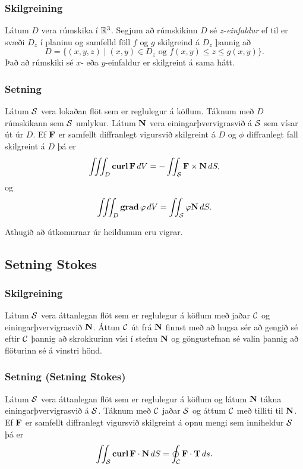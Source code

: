 \subsubsection{Skilgreining \rtask{}}
 Látum $D$ vera rúmskika í ${\mathbb R}^3$.  Segjum að rúmskikinn $D$ sé $z$-{\em einfaldur} ef til er svæði $D_z$ í planinu og samfelld föll $f$ og $g$ skilgreind á $D_z$ þannig að 
$$D=\{(x,y,z)\mid (x,y)\in D_z\mbox{ og }f(x,y)\leq z\leq g(x,y)\}.$$
Það að rúmskiki sé $x$- eða $y$-einfaldur er skilgreint á sama hátt. 





\subsubsection{Setning \rtask{}}
Látum $\cal S$ vera lokaðan flöt sem er reglulegur á köflum.  Táknum með $D$ rúmskikann sem $\cal S$ umlykur.  Látum $\mbox{${\bf N}$}$ vera einingarþvervigrasvið á $\cal S$   sem vísar út úr $D$.  Ef $\mbox{${\bf F}$}$ er samfellt diffranlegt vigursvið skilgreint á $D$ og $\phi$ diffranlegt fall skilgreint á $D$ þá er
$$\thrint_D\curl \Fv\,dV=-\tvint_{\cal S}\Fv\times\Nv\,dS,$$
og 
$$\thrint_D\grad\phi\,dV=\tvint_{\cal S}\phi\Nv\,dS.$$

Athugið að útkomurnar úr heildunum eru vigrar.




\subsection{Setning Stokes} 

\subsubsection{Skilgreining \rtask{}}
Látum $\cal S$ vera áttanlegan flöt sem er
reglulegur á köflum með
jaðar $\cal C$ og einingarþver\-vigrasvið $\mbox{${\bf N}$}$.  Áttun $\cal C$ út frá
$\mbox{${\bf N}$}$ finnst með að hugsa sér að gengið sé eftir $\cal C$
þannig að skrokkurinn vísi í stefnu $\mbox{${\bf N}$}$ og göngustefnan sé valin 
þannig að flöturinn sé á vinstri hönd. 



\subsubsection{Setning \rtask{} (Setning Stokes)}
Látum $\cal S$ vera áttanlegan flöt
sem er reglulegur á köflum og látum $\mbox{${\bf N}$}$ tákna einingarþvervigrasvið
á $\cal S$.  Táknum með $\cal C$ jaðar $\cal S$ og
áttum $\cal C$ með tilliti til $\mbox{${\bf N}$}$.    
Ef $\mbox{${\bf F}$}$ er samfellt diffranlegt vigursvið
skilgreint á opnu mengi sem inniheldur $\cal S$  þá er  
$$\int\!\!\!\int_{\cal S} \mbox{${\rm\bf curl\,}$}\mbox{${\bf F}$}\cdot\mbox{${\bf N}$}\,dS=\oint_{\cal C}\mbox{${\bf F}$}\cdot \mbox{${\bf T}$}\,ds.$$



